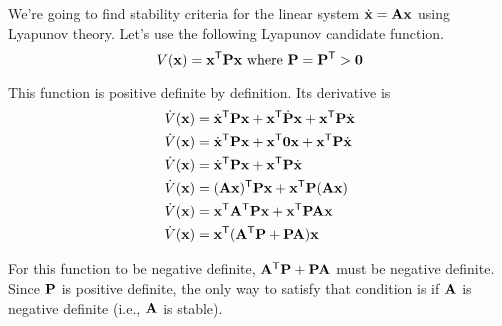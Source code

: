 We're going to find stability criteria for the linear system
$\dot{\mathbf{x}} = \mathbf{A}\mathbf{x}$ using Lyapunov theory. Let's use the following
Lyapunov candidate function.
\begin{equation*}
  V(\mathbf{x}) = \mathbf{x}^\mathsf{T}\mathbf{P}\mathbf{x} \text{ where }
    \mathbf{P} = \mathbf{P}^\mathsf{T} > \mathbf{0}
\end{equation*}

This function is positive definite by definition. Its derivative is
\begin{align*}
  \dot{V}(\mathbf{x}) &= \dot{\mathbf{x}}^\mathsf{T}\mathbf{P}\mathbf{x} +
    \mathbf{x}^\mathsf{T}\dot{\mathbf{P}}\mathbf{x} + \mathbf{x}^\mathsf{T}\mathbf{P}\dot{\mathbf{x}} \\
  \dot{V}(\mathbf{x}) &= \dot{\mathbf{x}}^\mathsf{T}\mathbf{P}\mathbf{x} +
    \mathbf{x}^\mathsf{T}\mathbf{0}\mathbf{x} + \mathbf{x}^\mathsf{T}\mathbf{P}\dot{\mathbf{x}} \\
  \dot{V}(\mathbf{x}) &= \dot{\mathbf{x}}^\mathsf{T}\mathbf{P}\mathbf{x} +
    \mathbf{x}^\mathsf{T}\mathbf{P}\dot{\mathbf{x}} \\
  \dot{V}(\mathbf{x}) &= (\mathbf{A}\mathbf{x})^\mathsf{T}\mathbf{P}\mathbf{x} +
    \mathbf{x}^\mathsf{T}\mathbf{P}(\mathbf{A}\mathbf{x}) \\
  \dot{V}(\mathbf{x}) &= \mathbf{x}^\mathsf{T}\mathbf{A}^\mathsf{T}\mathbf{P}\mathbf{x} +
    \mathbf{x}^\mathsf{T}\mathbf{P}\mathbf{A}\mathbf{x} \\
  \dot{V}(\mathbf{x}) &= \mathbf{x}^\mathsf{T}(\mathbf{A}^\mathsf{T}\mathbf{P} + \mathbf{P}\mathbf{A})\mathbf{x}
\end{align*}

For this function to be negative definite, $\mathbf{A}^\mathsf{T}\mathbf{P} + \mathbf{P}\mathbf{A}$
must be negative definite. Since $\mathbf{P}$ is positive definite, the only way to
satisfy that condition is if $\mathbf{A}$ is negative definite (i.e., $\mathbf{A}$ is
stable).
